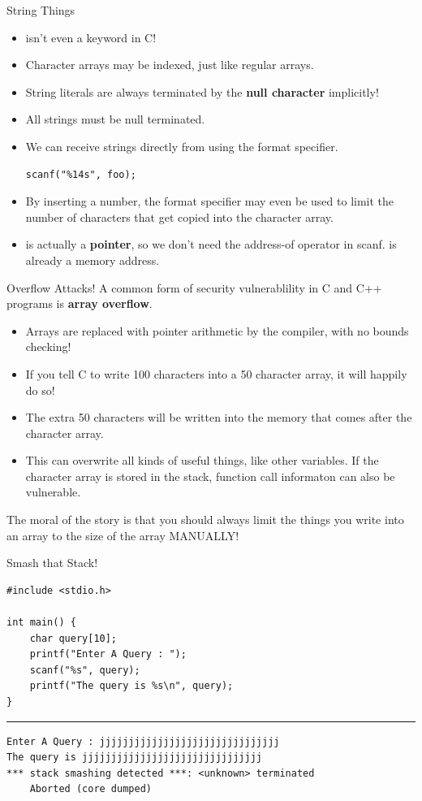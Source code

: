 \documentclass[11pt]{beamer}
\let\OldTexttt\texttt
\renewcommand{\texttt}[1]{\OldTexttt{\color{teal}{#1}}}
\begin{document}
\begin{frame}[fragile=singleslide]{String Things}
\begin{itemize}
\item \texttt{string} isn't even a keyword in C! 
\item Character arrays may be indexed, just like regular arrays.
\item String literals are always terminated by the \textbf{null character} implicitly!
\item All strings must be null terminated.
\item We can receive strings directly from \texttt{scanf} using the\texttt{\%s} format specifier.
\begin{lstlisting}[style=C]
scanf("%14s", foo);
\end{lstlisting}
\item By inserting a number, the format specifier may even be used to limit the number of characters that get copied into the character array.  
\item \texttt{foo} is actually a \textbf{pointer}, so we don't need the address-of operator \texttt{\&} in scanf. \texttt{foo} is already a memory address.
\end{itemize}
\end{frame}

\begin{frame}{Overflow Attacks!}
A common form of security vulnerablility in C and C++ programs is \textbf{array overflow}. 
\begin{itemize}
\item Arrays are replaced with pointer arithmetic by the compiler, with no bounds checking!  
\item If you tell C to write 100 characters into a 50 character array, it will happily do so! 
\item The extra 50 characters will be written into the memory that comes after the character array.
\item This can overwrite all kinds of useful things, like other variables.  If the character array is stored in the stack, function call informaton can also be vulnerable.  
\end{itemize}
The moral of the story is that you should always limit the things you write into an array to the size of the array MANUALLY! 
\end{frame}

\begin{frame}[fragile=singleslide]{Smash that Stack!}
\begin{lstlisting}[style = C]
#include <stdio.h>

int main() {
	char query[10];
	printf("Enter A Query : ");
	scanf("%s", query);
	printf("The query is %s\n", query);
}
\end{lstlisting}
\hrule
\begin{verbatim}
Enter A Query : jjjjjjjjjjjjjjjjjjjjjjjjjjjjjjj
The query is jjjjjjjjjjjjjjjjjjjjjjjjjjjjjjj
*** stack smashing detected ***: <unknown> terminated
	Aborted (core dumped)
\end{verbatim}
\end{frame}
\end{document}
